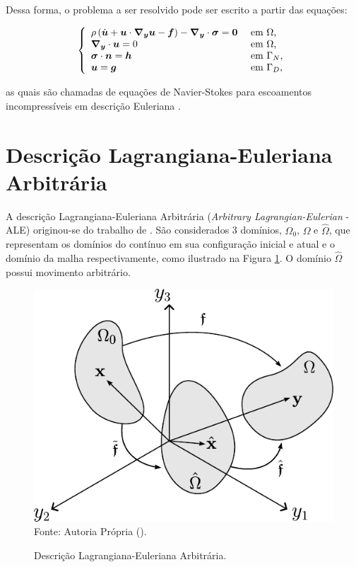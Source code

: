 Dessa forma, o problema a ser resolvido pode ser escrito a partir das equações:

\begin{equation}
    \left\{
    \begin{array}{ll}
        \rho\left({\dot{\boldsymbol{u}}+\boldsymbol{u}\cdot\boldsymbol{\nabla_y}\boldsymbol{u}-\boldsymbol{f}}\right)-\boldsymbol{\nabla_y}\cdot\boldsymbol{\sigma}=\boldsymbol{0} & \text{ em }\Omega\text{,}   \\
        \boldsymbol{\nabla_y}\cdot\boldsymbol{u}=0                                                           & \text{ em }\Omega\text{,}   \\
        \boldsymbol{\sigma}\cdot\boldsymbol{n}=\boldsymbol{h}                                                    & \text{ em }\Gamma_N\text{,} \\
        \boldsymbol{u}=\boldsymbol{g}                                                              & \text{ em }\Gamma_D\text{,}
    \end{array}
    \right.
    \label{eq:NS-Euler}
\end{equation}

\noindent as quais são chamadas de equações de Navier-Stokes para escoamentos incompressíveis em descrição Euleriana \cite{bazilevs2013computational,bazilevs2010large,bazilevs2007variational,hughes2002variational,hughes2000large}.

\section{Descrição Lagrangiana-Euleriana Arbitrária} \label{CFD-ALE}

A descrição Lagrangiana-Euleriana Arbitrária (\textit{Arbitrary Lagrangian-Eulerian} - ALE) originou-se do trabalho de . São considerados 3 domínios, $\Omega_0$, $\Omega$ e $\hat{\Omega}$, que representam os domínios do contínuo em sua configuração inicial e atual e o domínio da malha respectivamente, como ilustrado na Figura \ref{Fig:ALE}. O domínio $\hat{\Omega}$ possui movimento arbitrário.

\begin{figure}[h!]
    \centering
    \caption{Descrição Lagrangiana-Euleriana Arbitrária.}
    \includegraphics[width=.45\linewidth]{Figuras/ALE.pdf}
    \label{Fig:ALE}
    \\Fonte: Autoria Própria (\the\year).
\end{figure}

